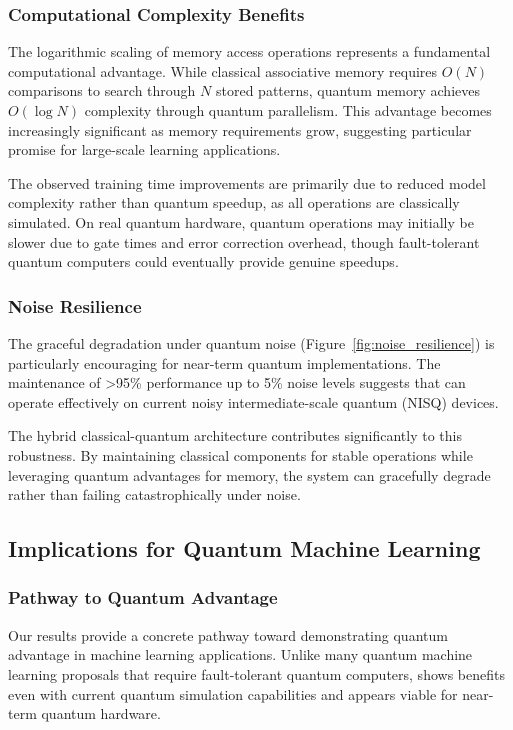 \subsubsection{Computational Complexity Benefits}

The logarithmic scaling of memory access operations represents a fundamental computational advantage. While classical associative memory requires $O(N)$ comparisons to search through $N$ stored patterns, quantum memory achieves $O(\log N)$ complexity through quantum parallelism. This advantage becomes increasingly significant as memory requirements grow, suggesting particular promise for large-scale learning applications.

The observed training time improvements are primarily due to reduced model complexity rather than quantum speedup, as all operations are classically simulated. On real quantum hardware, quantum operations may initially be slower due to gate times and error correction overhead, though fault-tolerant quantum computers could eventually provide genuine speedups.

\subsubsection{Noise Resilience}

The graceful degradation under quantum noise (Figure~\ref{fig:noise_resilience}) is particularly encouraging for near-term quantum implementations. The maintenance of >95\% performance up to 5\% noise levels suggests that \qmnn can operate effectively on current noisy intermediate-scale quantum (NISQ) devices.

The hybrid classical-quantum architecture contributes significantly to this robustness. By maintaining classical components for stable operations while leveraging quantum advantages for memory, the system can gracefully degrade rather than failing catastrophically under noise.

\subsection{Implications for Quantum Machine Learning}

\subsubsection{Pathway to Quantum Advantage}

Our results provide a concrete pathway toward demonstrating quantum advantage in machine learning applications. Unlike many quantum machine learning proposals that require fault-tolerant quantum computers, \qmnn shows benefits even with current quantum simulation capabilities and appears viable for near-term quantum hardware.

